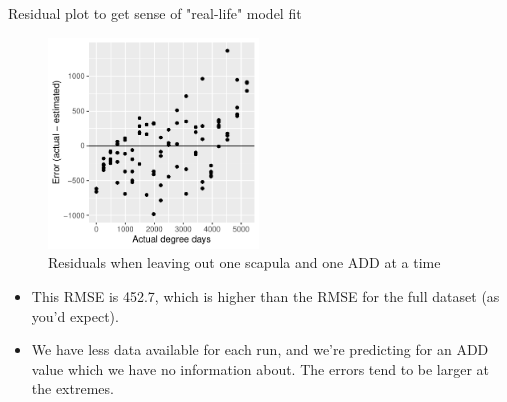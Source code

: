 \documentclass{beamer}
\begin{document}
\begin{frame}{Residual plot to get sense of "real-life" model fit}

  \begin{center}
    \begin{figure}
      \includegraphics[width=2.2in]{use_families/w_scapulae/leave_out_one_scapula_and_one_day_residuals}
      \caption{Residuals when leaving out one scapula and one ADD at a time}
    \end{figure}
  \end{center}
  \vspace{-0.1in}
{\scriptsize
\begin{itemize}
  \item This RMSE is 452.7, which is higher than the RMSE for the full
  dataset (as you'd expect).
  \item We have less data available for each run, and we're predicting for an
  ADD value which we have no information about.  The errors tend to be larger at
  the extremes.
\end{itemize}
}
\end{frame}
\end{document}
